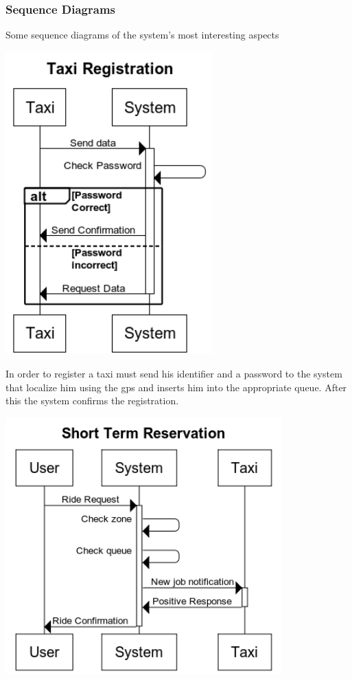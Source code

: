 \subsubsection{Sequence Diagrams}
	Some sequence diagrams of the system's most interesting aspects
	\begin{center}
		\includegraphics[width=0.60\textwidth]{./images/Taxi_Registration}
	\end{center}
	In order to register a taxi must send his identifier and a password to the system that localize him using the gps and inserts him into the appropriate queue. After this the system confirms the registration.
		\newpage
	\begin{center}
		\includegraphics[width=0.80\textwidth]{./images/Short_Term_Reservation}
	\end{center}
